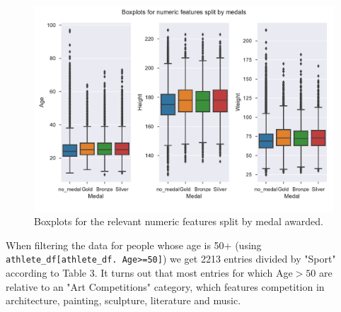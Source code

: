 \documentclass[11pt]{article} %
\begin{document}
\begin{figure}
    \centering
    \includegraphics[scale=0.6]{Boxplot_numeric_medals.pdf}
    \caption{Boxplots for the relevant numeric features split by medal awarded.}
\end{figure}

When filtering the data for people whose age is 50+ (using {\tt athlete\_df[athlete\_df. Age>=50]}) we get 2213 entries divided by "Sport" according to Table 3. It turns out that most entries for which Age$>50$ are relative to an "Art Competitions" category, which features competition in architecture, painting, sculpture, literature and music.
\end{document}

